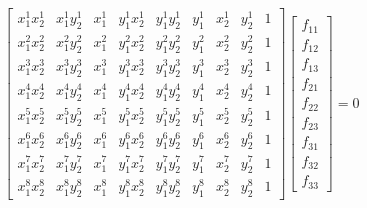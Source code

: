 \documentclass[12pt]{article}
\begin{document}
\begin{equation}
    \left[\begin{array}{ccccccccc}
        x_{1}^{1} x_{2}^{1} & x_{1}^{1} y_{2}^{1} & x_{1}^{1} & y_{1}^{1} x_{2}^{1} & y_{1}^{1} y_{2}^{1} & y_{1}^{1} & x_{2}^{1} & y_{2}^{1} & 1 \\
        x_{1}^{2} x_{2}^{2} & x_{1}^{2} y_{2}^{2} & x_{1}^{2} & y_{1}^{2} x_{2}^{2} & y_{1}^{2} y_{2}^{2} & y_{1}^{2} & x_{2}^{2} & y_{2}^{2} & 1 \\
        x_{1}^{3} x_{2}^{3} & x_{1}^{3} y_{2}^{3} & x_{1}^{3} & y_{1}^{3} x_{2}^{3} & y_{1}^{3} y_{2}^{3} & y_{1}^{3} & x_{2}^{3} & y_{2}^{3} & 1 \\
        x_{1}^{4} x_{2}^{4} & x_{1}^{4} y_{2}^{4} & x_{1}^{4} & y_{1}^{4} x_{2}^{4} & y_{1}^{4} y_{2}^{4} & y_{1}^{4} & x_{2}^{4} & y_{2}^{4} & 1 \\
        x_{1}^{5} x_{2}^{5} & x_{1}^{5} y_{2}^{5} & x_{1}^{5} & y_{1}^{5} x_{2}^{5} & y_{1}^{5} y_{2}^{5} & y_{1}^{5} & x_{2}^{5} & y_{2}^{5} & 1 \\
        x_{1}^{6} x_{2}^{6} & x_{1}^{6} y_{2}^{6} & x_{1}^{6} & y_{1}^{6} x_{2}^{6} & y_{1}^{6} y_{2}^{6} & y_{1}^{6} & x_{2}^{6} & y_{2}^{6} & 1 \\
        x_{1}^{7} x_{2}^{7} & x_{1}^{7} y_{2}^{7} & x_{1}^{7} & y_{1}^{7} x_{2}^{7} & y_{1}^{7} y_{2}^{7} & y_{1}^{7} & x_{2}^{7} & y_{2}^{7} & 1 \\
        x_{1}^{8} x_{2}^{8} & x_{1}^{8} y_{2}^{8} & x_{1}^{8} & y_{1}^{8} x_{2}^{8} & y_{1}^{8} y_{2}^{8} & y_{1}^{8} & x_{2}^{8} & y_{2}^{8} & 1
        \end{array}\right]\left[\begin{array}{c}
            f_{11} \\
            f_{12} \\
            f_{13} \\
            f_{21} \\
            f_{22} \\
            f_{23} \\
            f_{31} \\
            f_{32} \\
            f_{33}
            \end{array}\right]=0
\end{equation}

\newpage
\end{document}
